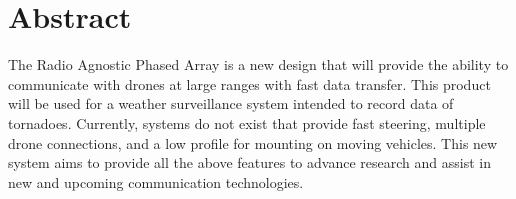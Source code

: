 \documentclass[UROP.tex]{subfiles}
\begin{document}
\bigskip
\section*{\Large Abstract}
	The Radio Agnostic Phased Array is a new design that will provide the ability to communicate with drones at large ranges with fast data transfer.  This product will be used for a weather surveillance system intended to record data of tornadoes.  Currently, systems do not exist that provide fast steering, multiple drone connections, and a low profile for mounting on moving vehicles.  This new system aims to provide all the above features to advance research and assist in new and upcoming communication technologies.
\end{document}
